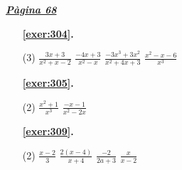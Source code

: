 \hyperlink{page.68}{\textbf{\em Pàgina 68}}
\begin{enumerate}



 \item[\fontfamily{phv}\selectfont\color{blue}\textbf{\ref{exer:304}. }] \label{ans:304}
 \begin{tasks}[column-sep=1em, item-indent=1.3333em](3)
	 \task $\frac {3x+3}{x^2+x-2}$
	 \task $\frac {-4x+3}{x^2-x}$
	 \task $\frac {-3x^3+3x^2}{x^2+4x+3}$
	 \task $\frac {x^2-x-6}{x^3}$
\end{tasks}
 \end{enumerate}
\begin{enumerate}



 \item[\fontfamily{phv}\selectfont\color{blue}\textbf{\ref{exer:305}. }] \label{ans:305}
 \begin{tasks}[column-sep=1em, item-indent=1.3333em](2)
	 \task $\frac {x^2+1}{x^3}$
	 \task $\frac {-x-1}{x^2-2x}$
\end{tasks}



 \item[\fontfamily{phv}\selectfont\color{blue}\textbf{\ref{exer:309}. }] \label{ans:309}
 \begin{tasks}[column-sep=1em, item-indent=1.3333em](2)
	 \task $\frac {x-2}{3}$
	 \task $\frac {2(x-4)}{x+4}$
	 \task $\frac {-2}{2a+3}$
	 \task $\frac {x}{x-2}$
\end{tasks}
 \end{enumerate}
\vspace{0.3cm}


